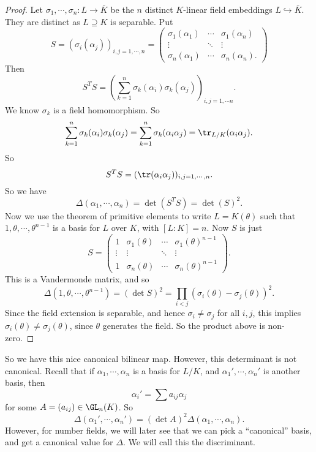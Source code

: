 \documentclass[a4paper]{article}
\begin{document}
\begin{proof}
  Let $\sigma_1, \cdots, \sigma_n: L \to \bar{K}$ be the $n$ distinct $K$-linear field embeddings $L \hookrightarrow \bar{K}$. They are distinct as $L \supseteq K$ is separable. Put
  \[
    S = (\sigma_i(\alpha_j))_{i, j = 1, \cdots, n} =
    \begin{pmatrix}
      \sigma_1(\alpha_1) & \cdots & \sigma_1(\alpha_n)\\
      \vdots & \ddots & \vdots\\
      \sigma_n(\alpha_1) & \cdots & \sigma_n(\alpha_n).
    \end{pmatrix}
  \]
  Then
  \[
    S^T S = \left(\sum_{k = 1}^n \sigma_k(\alpha_i)\sigma_k(\alpha_j)\right)_{i,j = 1, \cdots n}.
  \]
  We know $\sigma_k$ is a field homomorphism. So
  \[
    \sum_{k = 1}^n \sigma_k (\alpha_i)\sigma_k(\alpha_j) = \sum_{k = 1}^n \sigma_k(\alpha_i \alpha_j) = \tr_{L/K}(\alpha_i \alpha_j).
  \]
  So
  \[
    S^T S = (\tr(\alpha_i\alpha_j))_{i, j = 1, \cdots, n}.
  \]
  So we have
  \[
    \Delta(\alpha_1, \cdots, \alpha_n) = \det(S^T S) = \det(S)^2.
  \]
  Now we use the theorem of primitive elements to write $L = K(\theta)$ such that $1, \theta, \cdots, \theta^{n - 1}$ is a basis for $L$ over $K$, with $[L:K] = n$. Now $S$ is just
  \[
    S =
    \begin{pmatrix}
      1 & \sigma_1(\theta) & \cdots & \sigma_1(\theta)^{n - 1}\\
      \vdots & \vdots & \ddots & \vdots\\
      1 & \sigma_n(\theta) & \cdots & \sigma_n(\theta)^{n - 1}
    \end{pmatrix}.
  \]
  This is a Vandermonde matrix, and so
  \[
    \Delta(1, \theta, \cdots, \theta^{n - 1}) = (\det S)^2 = \prod_{i < j} (\sigma_i(\theta) - \sigma_j(\theta))^2.
  \]
  Since the field extension is separable, and hence $\sigma_i \not= \sigma_j$ for all $i, j$, this implies $\sigma_i (\theta) \not= \sigma_j(\theta)$, since $\theta$ generates the field. So the product above is non-zero.
\end{proof}
So we have this nice canonical bilinear map. However, this determinant is not canonical. Recall that if $\alpha_1, \cdots, \alpha_n$ is a basis for $L/K$, and $\alpha_1', \cdots, \alpha_n'$ is another basis, then
\[
  \alpha_i' = \sum a_{ij}\alpha_j
\]
for some $A = (a_{ij}) \in \GL_n(K)$. So
\[
  \Delta(\alpha_1', \cdots, \alpha_n') = (\det A)^2 \Delta(\alpha_1, \cdots, \alpha_n).
\]
However, for number fields, we will later see that we can pick a ``canonical'' basis, and get a canonical value for $\Delta$. We will call this the discriminant.
\end{document}
